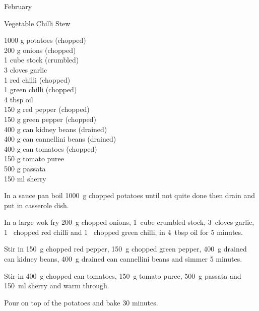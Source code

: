 \begin{menu}{February}
    \begin{recipe}{2}{Vegetable Chilli Stew}%
		\begin{ingredients}
		1000 g potatoes (chopped) \\
	200 g onions (chopped) \\
	1 cube stock (crumbled) \\
	3 cloves garlic  \\
	1  red chilli (chopped) \\
	1  green chilli (chopped) \\
	4 tbsp oil  \\
	150 g red pepper (chopped) \\
	150 g green pepper (chopped) \\
	400 g can kidney beans (drained) \\
	400 g can cannellini beans (drained) \\
	400 g can tomatoes (chopped) \\
	150 g tomato puree  \\
	500 g passata  \\
	150 ml sherry  \\
	
		\end{ingredients}
	
    \begin{instructions}
    \item 
        In a sauce pan boil
        1000~g chopped potatoes
        until not quite done
        then drain and put in casserole dish.
      \item 
        In a large wok fry
        200~g chopped onions,
        1~cube crumbled stock,
        3~cloves  garlic,
        1~ chopped red chilli
        and
        1~ chopped green chilli,
        in
        4~tbsp  oil
        for 5 minutes.
      \item 
        Stir in
        150~g chopped red pepper,
        150~g chopped green pepper,
        400~g drained can kidney beans,
        400~g drained can cannellini beans
        and simmer 5 minutes.
      \item 
        Stir in
        400~g chopped can tomatoes,
        150~g  tomato puree,
        500~g  passata
        and
        150~ml  sherry
        and warm through.
      \item 
        Pour on top of the potatoes
        and bake 30 minutes.
      
    \end{instructions}
    \end{recipe}%
  

\end{menu}
